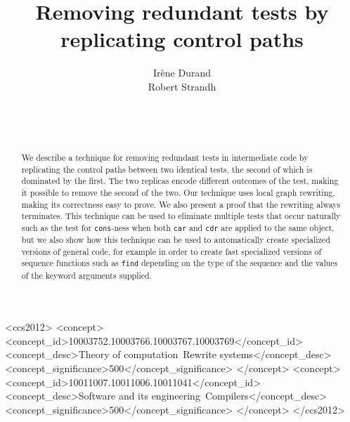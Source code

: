 \documentclass{sig-alternate-05-2015}
\def\inputtex#1{}
\begin{document}
\title{Removing redundant tests by replicating control paths}
\author{\alignauthor
Irène Durand\\
Robert Strandh\\
\\
\\
\\
}

\maketitle

\begin{abstract}
We describe a technique for removing redundant tests in intermediate
code by replicating the control paths between two identical tests, the
second of which is dominated by the first.  The two replicas encode
different outcomes of the test, making it possible to remove the
second of the two.  Our technique uses local graph rewriting, making
its correctness easy to prove.  We also present a proof that the
rewriting always terminates.  This technique can be used to eliminate
multiple tests that occur naturally such as the test for
\texttt{cons}-ness when both \texttt{car} and \texttt{cdr} are applied
to the same object, but we also show how this technique can be used to
automatically create specialized versions of general code, for example
in order to create fast specialized versions of sequence functions
such as \texttt{find} depending on the type of the sequence and the
values of the keyword arguments supplied.
\end{abstract}

\begin{CCSXML}
<ccs2012>
<concept>
<concept_id>10003752.10003766.10003767.10003769</concept_id>
<concept_desc>Theory of computation~Rewrite systems</concept_desc>
<concept_significance>500</concept_significance>
</concept>
<concept>
<concept_id>10011007.10011006.10011041</concept_id>
<concept_desc>Software and its engineering~Compilers</concept_desc>
<concept_significance>500</concept_significance>
</concept>
</ccs2012>
\end{CCSXML}


\printccsdesc


\inputtex{sec-introduction.tex}
\inputtex{sec-previous.tex}
\inputtex{sec-our-method.tex}
\inputtex{sec-benefits.tex}
\inputtex{sec-conclusions.tex}
\inputtex{sec-acknowledgments.tex}



\end{document}
